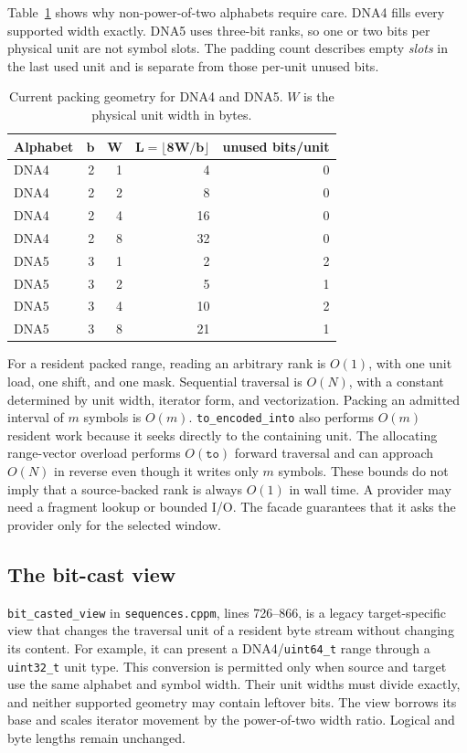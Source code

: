 Table~\ref{tab:packing-geometries} shows why non-power-of-two alphabets require
care.  DNA4 fills every supported width exactly.  DNA5 uses three-bit ranks,
so one or two bits per physical unit are not symbol slots.  The padding count
describes empty \emph{slots} in the last used unit and is separate from those
per-unit unused bits.

\begin{table}[ht]
\centering
\caption{Current packing geometry for DNA4 and DNA5.  \(W\) is the physical
unit width in bytes.}
\label{tab:packing-geometries}
\begin{tabular}{lrrrr}
\textbf{Alphabet} & \(\boldsymbol{b}\) & \(\boldsymbol{W}\) &
\(\boldsymbol{L=\lfloor8W/b\rfloor}\) & \textbf{unused bits/unit}\\
\hline
DNA4 & 2 & 1 & 4  & 0\\
DNA4 & 2 & 2 & 8  & 0\\
DNA4 & 2 & 4 & 16 & 0\\
DNA4 & 2 & 8 & 32 & 0\\
DNA5 & 3 & 1 & 2  & 2\\
DNA5 & 3 & 2 & 5  & 1\\
DNA5 & 3 & 4 & 10 & 2\\
DNA5 & 3 & 8 & 21 & 1\\
\end{tabular}
\end{table}

For a resident packed range, reading an arbitrary rank is \(O(1)\), with one
unit load, one shift, and one mask.  Sequential traversal is \(O(N)\), with a
constant determined by unit width, iterator form, and vectorization.  Packing
an admitted interval of \(m\) symbols is \(O(m)\).
\texttt{to\_encoded\_into} also performs \(O(m)\) resident work because it
seeks directly to the containing unit.  The allocating range-vector overload
performs \(O(\mathtt{to})\) forward traversal and can approach \(O(N)\) in
reverse even though it writes only \(m\) symbols.  These bounds do not imply
that a source-backed rank is always
\(O(1)\) in wall time.  A provider may need a fragment lookup or bounded I/O.
The facade guarantees that it asks the provider only for the selected window.

\raggedbottom
\subsection{The bit-cast view}

\texttt{bit\_casted\_view} in \texttt{sequences.cppm}, lines 726--866, is a
legacy target-specific view that changes the traversal unit of a resident byte
stream without changing its content.  For example, it can present a
DNA4/\texttt{uint64\_t} range through a \texttt{uint32\_t} unit type.  This
conversion is permitted only when source and target use the same alphabet and
symbol width.  Their unit widths must divide exactly, and neither supported
geometry may contain leftover bits.  The view borrows its base and scales
iterator movement by the power-of-two width ratio.  Logical and byte lengths
remain unchanged.

